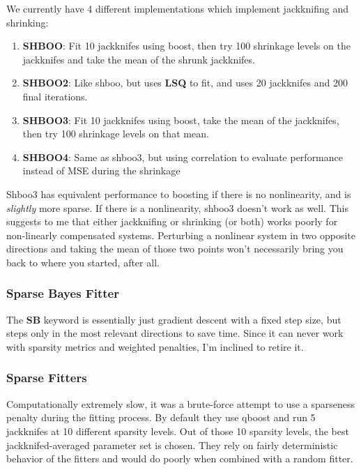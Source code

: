 \documentclass[11pt]{article}
\begin{document}
    We currently have 4 different implementations which implement jackknifing and shrinking:
\begin{enumerate}
\item \textbf{SHBOO}: Fit 10 jackknifes using boost, then try 100 shrinkage levels on the jackknifes and take the mean of the shrunk jackknifes.
\item \textbf{SHBOO2}: Like shboo, but uses \textbf{LSQ} to fit, and uses 20 jackknifes and 200 final iterations.
\item \textbf{SHBOO3}: Fit 10 jackknifes using boost, take the mean of the jackknifes, then try 100 shrinkage levels on that mean.
\item \textbf{SHBOO4}: Same as shboo3, but using correlation to evaluate performance instead of MSE during the shrinkage
\end{enumerate}
    Shboo3 has equivalent performance to boosting if there is no nonlinearity, and is \emph{slightly} more sparse. If there is a nonlinearity, shboo3 doesn't work as well. This suggests to me that either jackknifing or shrinking (or both) works poorly for non-linearly compensated systems. Perturbing a nonlinear system in two opposite directions and taking the mean of those two points won't necessarily bring you back to where you started, after all. 

\subsubsection{Sparse Bayes Fitter}
\label{sec-2.8.8}

    
    The \textbf{SB} keyword is essentially just gradient descent with a fixed step size, but steps only in the most relevant directions to save time. Since it can never work with sparsity metrics and weighted penalties, I'm inclined to retire it. 

\subsubsection{Sparse Fitters}
\label{sec-2.8.9}


    Computationally extremely slow, it was a brute-force attempt to use a sparseness penalty during the fitting process. By default they use qboost and run 5 jackknifes at 10 different sparsity levels. Out of those 10 sparsity levels, the best jackknifed-averaged parameter set is chosen. They rely on fairly deterministic behavior of the fitters and would do poorly when combined with a random fitter. 
    
\end{document}
